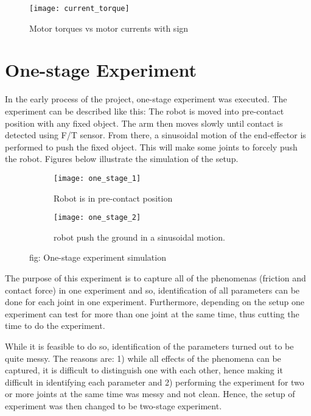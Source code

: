 \begin{figure}[H]
    \centering
    \texttt{[image: current\_torque]}
    \caption{Motor torques vs motor currents with sign}
    \label{fig:current vs torque}
\end{figure}

\section{One-stage Experiment}
In the early process of the project, one-stage experiment was executed. The experiment can be described like this: The robot is moved into pre-contact position with any fixed object. The arm then moves slowly until contact is detected using F/T sensor. From there, a sinusoidal motion of the end-effector is performed to push the fixed object. This will make some joints to forcely push the robot. Figures below illustrate the simulation of the setup.

\begin{figure}[H]
  \begin{subfigure}[t]{0.5\textwidth}
    \centering
    \texttt{[image: one\_stage\_1]} 
    \caption{Robot is in pre-contact position}
  \end{subfigure}
  \begin{subfigure}[t]{0.5\textwidth}
    \centering
    \texttt{[image: one\_stage\_2]}
    \caption{robot push the ground in a sinusoidal motion.}
  \end{subfigure}
  \caption{fig: One-stage experiment simulation}
\end{figure}

The purpose of this experiment is to capture all of the phenomenas (friction and contact force) in one experiment and so, identification of all parameters can be done for each joint in one experiment. Furthermore, depending on the setup one experiment can test for more than one joint at the same time, thus cutting the time to do the experiment. 

While it is feasible to do so, identification of the parameters turned out to be quite messy. The reasons are: 1) while all effects of the phenomena can be captured, it is difficult to distinguish one with each other, hence making it difficult in identifying each parameter and 2) performing the experiment for two or more joints at the same time was messy and not clean. Hence, the setup of experiment was then changed to be two-stage experiment.

